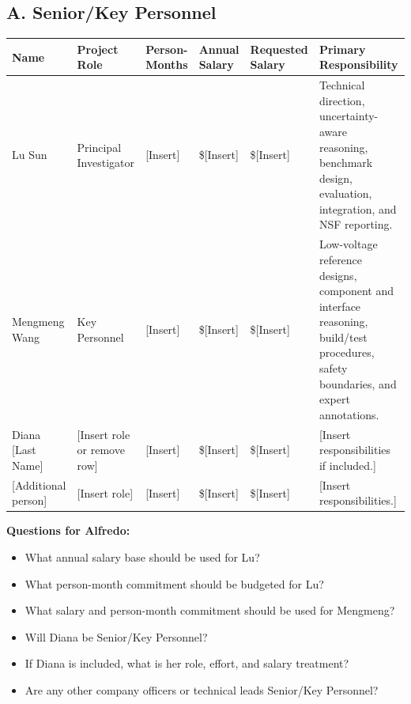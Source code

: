 \documentclass[11pt,letterpaper]{article}
\begin{document}
\subsection*{A. Senior/Key Personnel}

\begin{table}[htbp]
\centering
\renewcommand{\arraystretch}{1.25}
\begin{tabularx}{\textwidth}{
    p{}
    p{}
    p{}
    p{}
    p{}
    X
}
\toprule
\textbf{Name} &
\textbf{Project Role} &
\textbf{Person-Months} &
\textbf{Annual Salary} &
\textbf{Requested Salary} &
\textbf{Primary Responsibility} \\
\midrule

Lu Sun &
Principal Investigator &
[Insert] &
\$[Insert] &
\$[Insert] &
Technical direction, uncertainty-aware reasoning, benchmark design,
evaluation, integration, and NSF reporting. \\

Mengmeng Wang &
Key Personnel &
[Insert] &
\$[Insert] &
\$[Insert] &
Low-voltage reference designs, component and interface reasoning,
build/test procedures, safety boundaries, and expert annotations. \\

Diana [Last Name] &
[Insert role or remove row] &
[Insert] &
\$[Insert] &
\$[Insert] &
[Insert responsibilities if included.] \\

[Additional person] &
[Insert role] &
[Insert] &
\$[Insert] &
\$[Insert] &
[Insert responsibilities.] \\

\bottomrule
\end{tabularx}
\end{table}

\noindent
\textbf{Questions for Alfredo:}

\begin{itemize}
    \item What annual salary base should be used for Lu?
    \item What person-month commitment should be budgeted for Lu?
    \item What salary and person-month commitment should be used for Mengmeng?
    \item Will Diana be Senior/Key Personnel?
    \item If Diana is included, what is her role, effort, and salary treatment?
    \item Are any other company officers or technical leads Senior/Key Personnel?
\end{itemize}
\end{document}

